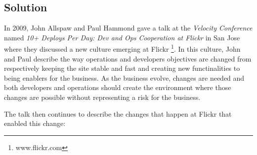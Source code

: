       \subsection{Solution}  \label{chap:stateoftheheart:sec:devops:sec:solution}

      In 2009, John Allspaw and Paul Hammond gave a talk at the \textit{Velocity Conference} named \textit{10+ Deploys Per Day: Dev and Ops Cooperation at Flickr} in San Jose where they discussed a new culture emerging at Flickr \footnote{www.flickr.com}. In this culture, John and Paul describe the way operations and developers objectives are changed from respectively keeping the site stable and fast and creating new functinalities to being enablers for the business. As the business evolve, changes are needed and both developers and operations should create the environment where those changes are possible without representing a risk for the business.

      The talk then continues to describe the changes that happen at Flickr that enabled this change:


